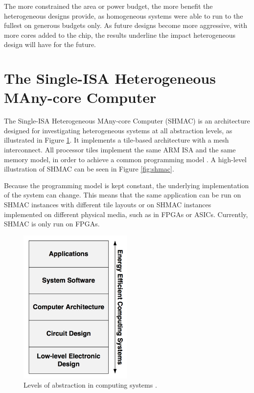 The more constrained the area or power budget, the more benefit the heterogeneous designs provide, as homogeneous systems were able to run to the fullest on generous budgets only.
As future designs become more aggressive, with more cores added to the chip, the results underline the impact heterogeneous design will have for the future. 

\section{The Single-ISA Heterogeneous MAny-core Computer}
\label{sec:shmac}

The Single-ISA Heterogeneous MAny-core Computer (SHMAC) is an architecture designed for investigating heterogeneous
systems at all abstraction levels, as illustrated in Figure \ref{fig:shmacAbstractionLevels}.
It implements a tile-based architecture with a mesh interconnect. All processor tiles implement the same
ARM ISA and the same memory model, in order to achieve a common programming model \cite{shmac-plan}.
A high-level illustration of SHMAC can be seen in Figure \ref{fig:shmac}.

Because the programming model is kept constant, the underlying implementation of the system can change.
This means that the same application can be run on SHMAC instances with different tile layouts or on
SHMAC instances implemented on different physical media, such as in FPGAs or ASICs. Currently, SHMAC
is only run on FPGAs.

\begin{figure}[htb]
    \centering
    \includegraphics[width=0.5\textwidth]{Figures/Heterogeneous/SHMACAbstractionLevels}
    \caption{Levels of abstraction in computing systems \cite{shmac-plan}.}
    \label{fig:shmacAbstractionLevels}
\end{figure}

